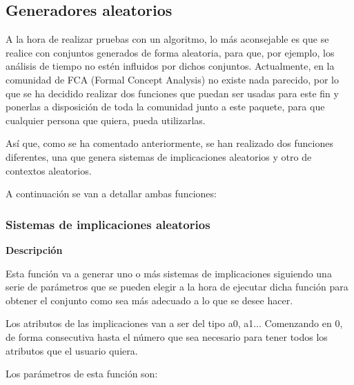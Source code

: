 \subsection{Generadores aleatorios}

A la hora de realizar pruebas con un algoritmo, lo m\'as aconsejable es que se realice con conjuntos generados de forma aleatoria, para 
que, por ejemplo, los an\'alisis de tiempo no est\'en influidos por dichos conjuntos. Actualmente, en la comunidad de FCA (Formal Concept 
Analysis) no existe nada parecido, por lo que se ha decidido realizar dos funciones que puedan ser usadas para este fin y ponerlas a 
disposici\'on de toda la comunidad junto a este paquete, para que cualquier persona que quiera, pueda utilizarlas.

As\'i que, como se ha comentado anteriormente, se han realizado dos funciones diferentes, una que genera sistemas de implicaciones 
aleatorios y otro de contextos aleatorios.

A continuaci\'on se van a detallar ambas funciones:

\subsubsection{Sistemas de implicaciones aleatorios}

    \textbf{Descripci\'on}
    
    Esta funci\'on va a generar uno o m\'as sistemas de implicaciones siguiendo una serie de par\'ametros que se pueden elegir a la 
    hora de ejecutar dicha funci\'on para obtener el conjunto como sea m\'as adecuado a lo que se desee hacer.

    Los atributos de las implicaciones van a ser del tipo a0, a1... Comenzando en 0, de forma consecutiva hasta el n\'umero que sea 
    necesario para tener todos los atributos que el usuario quiera.

    Los par\'ametros de esta funci\'on son:

